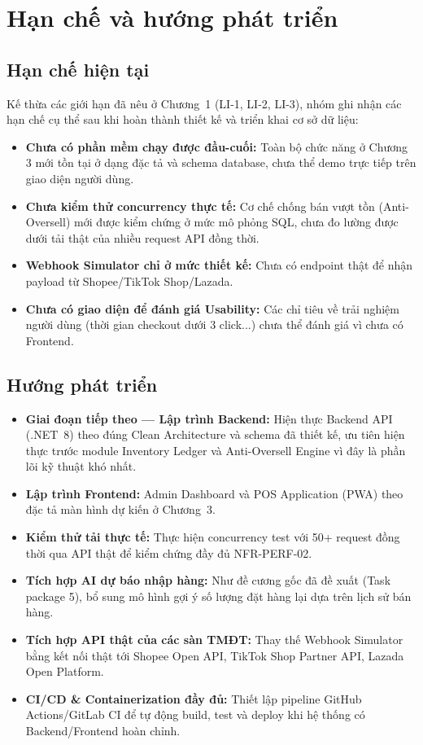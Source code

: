 \section{Hạn chế và hướng phát triển}

\subsection{Hạn chế hiện tại}
Kế thừa các giới hạn đã nêu ở Chương~1 (LI-1, LI-2, LI-3), nhóm ghi nhận các hạn chế cụ thể sau khi hoàn thành thiết kế và triển khai cơ sở dữ liệu:
\begin{itemize}
    \item \textbf{Chưa có phần mềm chạy được đầu-cuối:} Toàn bộ chức năng ở Chương 3 mới tồn tại ở dạng đặc tả và schema database, chưa thể demo trực tiếp trên giao diện người dùng.
    \item \textbf{Chưa kiểm thử concurrency thực tế:} Cơ chế chống bán vượt tồn (Anti-Oversell) mới được kiểm chứng ở mức mô phỏng SQL, chưa đo lường được dưới tải thật của nhiều request API đồng thời.
    \item \textbf{Webhook Simulator chỉ ở mức thiết kế:} Chưa có endpoint thật để nhận payload từ Shopee/TikTok Shop/Lazada.
    \item \textbf{Chưa có giao diện để đánh giá Usability:} Các chỉ tiêu về trải nghiệm người dùng (thời gian checkout dưới 3 click...) chưa thể đánh giá vì chưa có Frontend.
\end{itemize}

\subsection{Hướng phát triển}
\begin{itemize}
    \item \textbf{Giai đoạn tiếp theo — Lập trình Backend:} Hiện thực Backend API (.NET~8) theo đúng Clean Architecture và schema đã thiết kế, ưu tiên hiện thực trước module Inventory Ledger và Anti-Oversell Engine vì đây là phần lõi kỹ thuật khó nhất.
    \item \textbf{Lập trình Frontend:} Admin Dashboard và POS Application (PWA) theo đặc tả màn hình dự kiến ở Chương~3.
    \item \textbf{Kiểm thử tải thực tế:} Thực hiện concurrency test với 50+ request đồng thời qua API thật để kiểm chứng đầy đủ NFR-PERF-02.
    \item \textbf{Tích hợp AI dự báo nhập hàng:} Như đề cương gốc đã đề xuất (Task package 5), bổ sung mô hình gợi ý số lượng đặt hàng lại dựa trên lịch sử bán hàng.
    \item \textbf{Tích hợp API thật của các sàn TMĐT:} Thay thế Webhook Simulator bằng kết nối thật tới Shopee Open API, TikTok Shop Partner API, Lazada Open Platform.
    \item \textbf{CI/CD \& Containerization đầy đủ:} Thiết lập pipeline GitHub Actions/GitLab CI để tự động build, test và deploy khi hệ thống có Backend/Frontend hoàn chỉnh.
\end{itemize}

